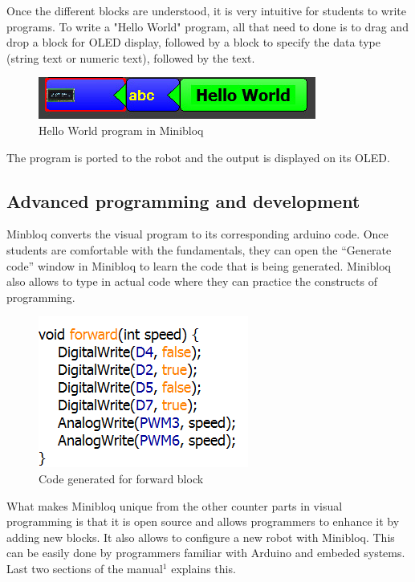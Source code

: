 \documentclass[conference]{IEEEtran}
\begin{document}
Once the different blocks are understood, it is very intuitive for students to write programs. To write a "Hello World" program, all that need to done is to drag and drop a block for OLED display, followed by a block to specify the data type (string text or numeric text), followed by the text.

\begin{figure}[h]
\centering
\includegraphics[scale=0.5]{Fig_10.png}
\caption{Hello World program in Minibloq}
\end{figure}

The program is ported to the robot and the output is displayed on its OLED.

\subsection{Advanced programming and development}
Minbloq converts the visual program to its corresponding arduino code. Once students are comfortable with the fundamentals, they can open the “Generate code” window in Minibloq to learn the code that is being generated. Minibloq also allows to type in actual code where they can practice the constructs of programming.

\begin{figure}[h]
\centering
\includegraphics[scale=0.4]{Fig_12.png}
\caption{Code generated for forward block}
\end{figure}

What makes Minibloq unique from the other counter parts in visual programming is that it is open source and allows programmers to enhance it by adding new blocks. It also allows to configure a new robot with Minibloq. This can be easily done by programmers familiar with Arduino and embeded systems. Last two sections of the manual$^1$ explains this.
\end{document}
